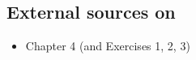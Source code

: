 
\subsection{External sources on }

\begin{itemize}
\item  \JE Chapter 4 (and Exercises 1, 2, 3)
\end{itemize}






